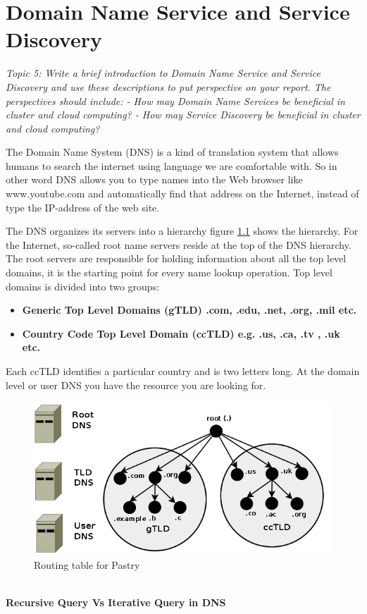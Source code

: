 \chapter{Domain Name Service and Service Discovery}\label{ch:dns}
\textit{Topic 5: Write a brief introduction to Domain Name Service and Service Discovery and use these descriptions to put perspective on your report. The perspectives should include:
- How may Domain Name Services be beneficial in cluster and cloud computing?
- How may Service Discovery be beneficial in cluster and cloud computing?}

The Domain Name System (DNS) is a kind of translation system that allows humans to search the internet using language we are comfortable with. So in other word DNS allows you to type names into the Web browser like www.youtube.com and automatically find that address on the Internet, instead of type the IP-address of the web site.

The DNS organizes its servers into a hierarchy figure \ref{fig:DNShierarchy} shows the hierarchy. For the Internet, so-called root name servers reside at the top of the DNS hierarchy. The root servers are responsible for holding information about all the top level domains, it is the starting point for every name lookup operation. Top level domains is divided into two groups:

\begin{itemize}
\item \textbf{Generic Top Level Domains (gTLD) .com, .edu, .net, .org, .mil etc.}
\item \textbf{ Country Code Top Level Domain (ccTLD) e.g. .us, .ca, .tv , .uk etc.}
\end{itemize}
Each ccTLD identifies a particular country and is two letters long.  At the domain level or user DNS you have the resource you are looking for.\begin{figure}[bth]
\includegraphics[width=1\linewidth]{gfx/DNShierarchy}
\caption[routingtable]{Routing table for Pastry} \label{fig:DNShierarchy}
\end{figure}
\\
\textbf{Recursive Query Vs Iterative Query in DNS}

